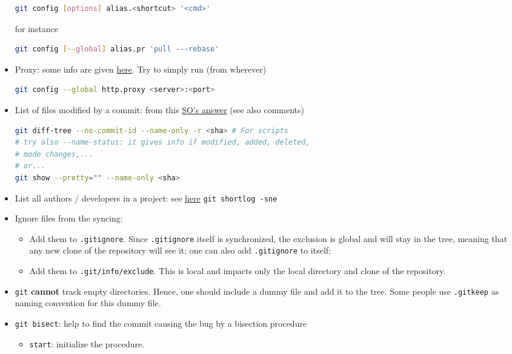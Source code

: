 \documentclass[a4paper,12pt,%
              final%
              ]{article}
\begin{document}
\begin{itemize}
\begin{lstlisting}[language=bash]
git config [options] alias.<shortcut> '<cmd>'
\end{lstlisting}
        for instance
\begin{lstlisting}[language=bash]
git config [--global] alias.pr 'pull ---rebase'
\end{lstlisting}
  \item Proxy: some info are given \href{https://gist.github.com/evantoli/f8c23a37eb3558ab8765}{here}. Try to simply run (from wherever)
\begin{lstlisting}[language=bash]
git config --global http.proxy <server>:<port>
\end{lstlisting}
  \item List of files modified by a commit: from this \href{https://stackoverflow.com/a/424142/12152457}{SO's answer} (see also comments)
\begin{lstlisting}[language=bash]
git diff-tree --no-commit-id --name-only -r <sha> # For scripts
# try also --name-status: it gives info if modified, added, deleted,
# mode changes,...
# or...
git show --pretty="" --name-only <sha>
\end{lstlisting}
  \item List all authors / developers in a project: see \href{https://stackoverflow.com/questions/9597410/list-all-developers-on-a-project-in-git}{here} \verb|git shortlog -sne|
  \item Ignore files from the syncing:
    \begin{itemize}
      \item Add them to \texttt{.gitignore}. Since \texttt{.gitignore} itself is synchronized, the exclusion is global and will stay in the tree, meaning that any new clone of the repository will see it; one can also add \texttt{.gitignore} to itself;
      \item Add them to \texttt{.git/info/exclude}. This is local and impacts only the local directory and clone of the repository.
    \end{itemize}
  \item \texttt{git} \textbf{cannot} track empty directories. Hence, one should include a dummy file and add it to the tree. Some people use \verb|.gitkeep| as naming convention for this dummy file.
  \item \texttt{git bisect}: help to find the commit causing the bug by a bisection procedure
    \begin{itemize}
      \item \verb|start|: initialize the procedure.

\end{itemize}
\end{itemize}
\end{document}
